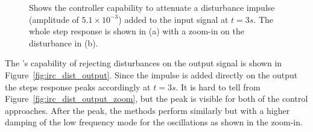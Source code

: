 \begin{figure}[h!]
  \centering %
  \qquad
  \caption{\label{fig:irc_dist_input} Shows the controller capability to attenuate a disturbance impulse (amplitude of $5.1 \times 10^{-3}$) added to the input signal at $t=3s$. The whole step response is shown in (a) with a zoom-in on the disturbance in (b).}
\end{figure}

The \abbrIRC's capability of rejecting disturbances on the output signal is shown in Figure~\ref{fig:irc_dist_output}. Since the impulse is added directly on the output the steps response peaks accordingly at $t=3s$. It is hard to tell from Figure~\ref{fig:irc_dist_output_zoom}, but the peak is visible for both of the control approaches. After the peak, the methods perform similarly but with a higher damping of the low frequency mode for the \abbrIRC oscillations as shown in the zoom-in.

